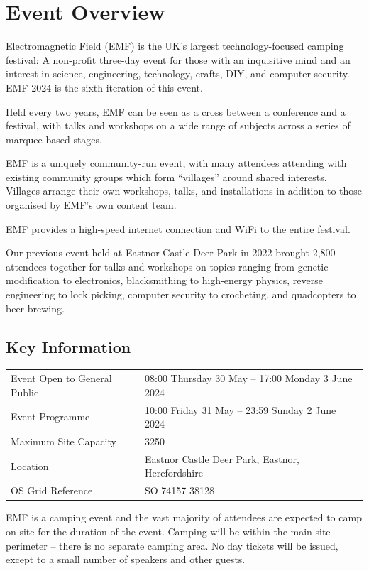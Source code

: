 \section{Event Overview}

Electromagnetic Field (EMF) is the UK's largest technology-focused camping festival:
A non-profit three-day event for those with an inquisitive mind and an interest in
science, engineering, technology, crafts, DIY, and computer security. EMF 2024 is the
sixth iteration of this event.

Held every two years, EMF can be seen as a cross between a conference and a
festival, with talks and workshops on a wide range of subjects across a series
of marquee-based stages.

EMF is a uniquely community-run event, with many attendees attending with existing
community groups which form ``villages'' around shared interests. Villages arrange their
own workshops, talks, and installations in addition to those organised by EMF's own
content team.

EMF provides a high-speed internet connection and WiFi to the entire festival.

Our previous event held at Eastnor Castle Deer Park in 2022 brought 2,800 attendees
together for talks and workshops on topics ranging from genetic modification to
electronics, blacksmithing to high-energy physics, reverse engineering to lock picking,
computer security to crocheting, and quadcopters to beer brewing.

\subsection{Key Information}

\begin{tabular}{l l}
    Event Open to General Public & 08:00 Thursday 30 May  -- 17:00 Monday 3 June 2024 \\
    Event Programme              & 10:00 Friday 31 May -- 23:59 Sunday 2 June 2024    \\
    Maximum Site Capacity        & 3250                                               \\
    Location                     & Eastnor Castle Deer Park, Eastnor, Herefordshire   \\
    OS Grid Reference            & SO 74157 38128                                     \\
\end{tabular}

EMF is a camping event and the vast majority of attendees are expected to camp on site for the duration
of the event. Camping will be within the main site perimeter -- there is no separate camping area.
No day tickets will be issued, except to a small number of speakers and other guests.

